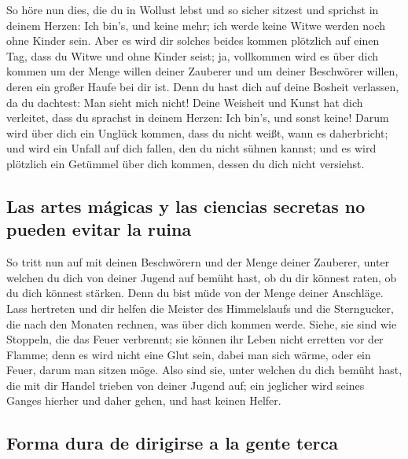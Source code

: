  So höre nun dies, die du in Wollust lebst und so sicher
sitzest und sprichst in deinem Herzen: Ich bin's, und keine mehr; ich
werde keine Witwe werden noch ohne Kinder sein.  Aber es
wird dir solches beides kommen plötzlich auf einen Tag, dass du Witwe
und ohne Kinder seist; ja, vollkommen wird es über dich kommen um der
Menge willen deiner Zauberer und um deiner Beschwörer willen, deren ein
großer Haufe bei dir ist.  Denn du hast dich auf deine
Bosheit verlassen, da du dachtest: Man sieht mich nicht! Deine Weisheit
und Kunst hat dich verleitet, dass du sprachst in deinem Herzen: Ich
bin's, und sonst keine!  Darum wird über dich ein Unglück
kommen, dass du nicht weißt, wann es daherbricht; und wird ein Unfall
auf dich fallen, den du nicht sühnen kannst; und es wird plötzlich ein
Getümmel über dich kommen, dessen du dich nicht versiehst.

\hypertarget{las-artes-muxe1gicas-y-las-ciencias-secretas-no-pueden-evitar-la-ruina}{%
\subsection{Las artes mágicas y las ciencias secretas no pueden evitar
la
ruina}\label{las-artes-muxe1gicas-y-las-ciencias-secretas-no-pueden-evitar-la-ruina}}

 So tritt nun auf mit deinen Beschwörern und der Menge
deiner Zauberer, unter welchen du dich von deiner Jugend auf bemüht
hast, ob du dir könnest raten, ob du dich könnest stärken.
 Denn du bist müde von der Menge deiner Anschläge. Lass
hertreten und dir helfen die Meister des Himmelslaufs und die
Sterngucker, die nach den Monaten rechnen, was über dich kommen werde.
 Siehe, sie sind wie Stoppeln, die das Feuer verbrennt;
sie können ihr Leben nicht erretten vor der Flamme; denn es wird nicht
eine Glut sein, dabei man sich wärme, oder ein Feuer, darum man sitzen
möge.  Also sind sie, unter welchen du dich bemüht hast,
die mit dir Handel trieben von deiner Jugend auf; ein jeglicher wird
seines Ganges hierher und daher gehen, und hast keinen Helfer.

\hypertarget{forma-dura-de-dirigirse-a-la-gente-terca}{%
\subsection{Forma dura de dirigirse a la gente
terca}\label{forma-dura-de-dirigirse-a-la-gente-terca}}

